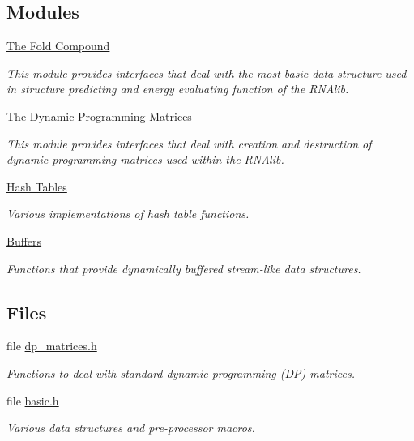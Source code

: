 \subsection*{Modules}
\begin{DoxyCompactItemize}
\item 
\hyperlink{group__fold__compound}{The Fold Compound}
\begin{DoxyCompactList}\small\item\em This module provides interfaces that deal with the most basic data structure used in structure predicting and energy evaluating function of the R\+N\+Alib. \end{DoxyCompactList}\item 
\hyperlink{group__dp__matrices}{The Dynamic Programming Matrices}
\begin{DoxyCompactList}\small\item\em This module provides interfaces that deal with creation and destruction of dynamic programming matrices used within the R\+N\+Alib. \end{DoxyCompactList}\item 
\hyperlink{group__hash__table__utils}{Hash Tables}
\begin{DoxyCompactList}\small\item\em Various implementations of hash table functions. \end{DoxyCompactList}\item 
\hyperlink{group__buffer__utils}{Buffers}
\begin{DoxyCompactList}\small\item\em Functions that provide dynamically buffered stream-\/like data structures. \end{DoxyCompactList}\end{DoxyCompactItemize}
\subsection*{Files}
\begin{DoxyCompactItemize}
\item 
file \hyperlink{dp__matrices_8h}{dp\+\_\+matrices.\+h}
\begin{DoxyCompactList}\small\item\em Functions to deal with standard dynamic programming (DP) matrices. \end{DoxyCompactList}\item 
file \hyperlink{datastructures_2basic_8h}{basic.\+h}
\begin{DoxyCompactList}\small\item\em Various data structures and pre-\/processor macros. \end{DoxyCompactList}\end{DoxyCompactItemize}

